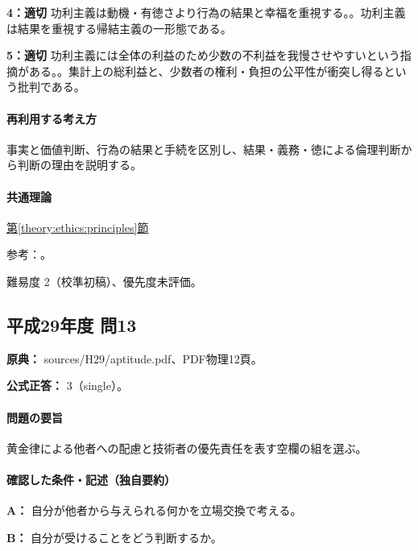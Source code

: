 \noindent\textbf{4：適切} 功利主義は動機・有徳さより行為の結果と幸福を重視する。。功利主義は結果を重視する帰結主義の一形態である。\par

\noindent\textbf{5：適切} 功利主義には全体の利益のため少数の不利益を我慢させやすいという指摘がある。。集計上の総利益と、少数者の権利・負担の公平性が衝突し得るという批判である。\par

\paragraph{再利用する考え方} 事実と価値判断、行為の結果と手続を区別し、結果・義務・徳による倫理判断から判断の理由を説明する。

\paragraph{共通理論} \hyperref[theory:ethics:principles]{第\ref*{theory:ethics:principles}節}

\par 参考：\cite{scu_ethics_framework}。

\par 難易度 2（校準初稿）、優先度未評価。

\subsection{平成29年度 問13}
\label{q:h29-reg-apt-13}

\noindent\textbf{原典：} sources/H29/aptitude.pdf、PDF物理12頁。

\textbf{公式正答：} 3（single）。

\paragraph{問題の要旨} 黄金律による他者への配慮と技術者の優先責任を表す空欄の組を選ぶ。

\paragraph{確認した条件・記述（独自要約）}\mbox{}\par

\noindent\textbf{A：} 自分が他者から与えられる何かを立場交換で考える。\par

\noindent\textbf{B：} 自分が受けることをどう判断するか。\par

